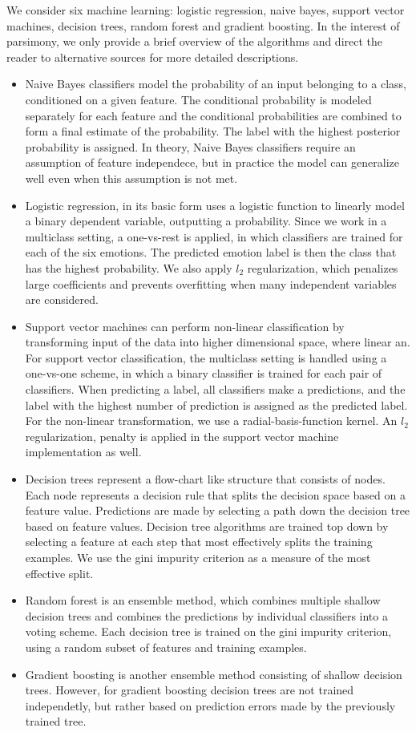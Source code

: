 \documentclass[conference]{IEEEtran}
\begin{document}
We consider six machine learning: logistic regression, naive bayes, support vector machines, decision trees, random forest and gradient boosting. In the interest of parsimony, we only provide a brief overview of the algorithms and direct the reader to alternative sources for more detailed descriptions.
\begin{itemize}
\item Naive Bayes classifiers model the probability of an input belonging to a class, conditioned on a given feature. The conditional probability is modeled separately for each feature and the conditional probabilities are combined to form a final estimate of the probability. The label with the highest posterior probability is assigned. In theory, Naive Bayes classifiers require an assumption of feature independece, but in practice the model can generalize well even when this assumption is not met.
\item Logistic regression, in its basic form uses a logistic function to linearly model a binary dependent variable, outputting a probability. Since we work in a multiclass setting, a one-vs-rest is applied, in which classifiers are trained for each of the six emotions. The predicted emotion label is then the class that has the highest probability. We also apply $l_2$ regularization, which penalizes large coefficients and prevents overfitting when many independent variables are considered.
\item Support vector machines can perform non-linear classification by transforming input of the data into higher dimensional space, where linear  an. For support vector classification, the multiclass setting is handled using a one-vs-one scheme, in which a binary classifier is trained for each pair of classifiers. When predicting a label, all classifiers make a predictions, and the label with the highest number of prediction is assigned as the predicted label. For the non-linear transformation, we use a radial-basis-function kernel. An $l_2$ regularization, penalty is applied in the support vector machine implementation as well.
\item Decision trees represent a flow-chart like structure that consists of nodes. Each node represents a decision rule that splits the decision space based on a feature value. Predictions are made by selecting a path down the decision tree based on feature values. Decision tree algorithms are trained top down by selecting a feature at each step that most effectively splits the training examples. We use the gini impurity criterion as a measure of the most effective split.
\item Random forest is an ensemble method, which combines multiple shallow decision trees and combines the predictions by individual classifiers into a voting scheme. Each decision tree is trained on the gini impurity criterion, using a random subset of features and training examples.
\item Gradient boosting is another ensemble method consisting of shallow decision trees. However, for gradient boosting decision trees are not trained independetly, but rather based on prediction errors made by the previously trained tree.
\end{itemize}
\end{document}
